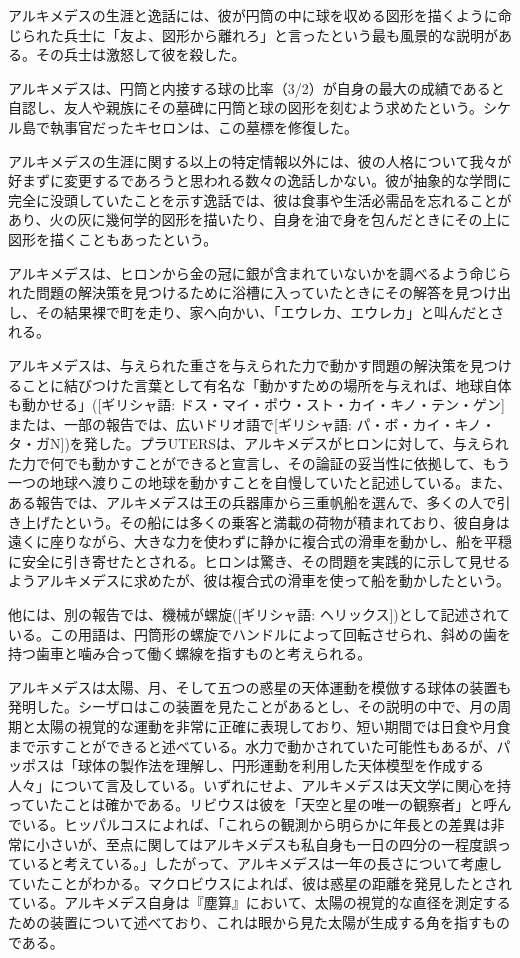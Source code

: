 \documentclass[a4paper,11pt,openany]{ltjsbook}
\begin{document}
アルキメデスの生涯と逸話には、彼が円筒の中に球を収める図形を描くように命じられた兵士に「友よ、図形から離れろ」と言ったという最も風景的な説明がある。その兵士は激怒して彼を殺した。

アルキメデスは、円筒と内接する球の比率（3/2）が自身の最大の成績であると自認し、友人や親族にその墓碑に円筒と球の図形を刻むよう求めたという。シケル島で執事官だったキセロンは、この墓標を修復した。

アルキメデスの生涯に関する以上の特定情報以外には、彼の人格について我々が好まずに変更するであろうと思われる数々の逸話しかない。彼が抽象的な学問に完全に没頭していたことを示す逸話では、彼は食事や生活必需品を忘れることがあり、火の灰に幾何学的図形を描いたり、自身を油で身を包んだときにその上に図形を描くこともあったという。

アルキメデスは、ヒロンから金の冠に銀が含まれていないかを調べるよう命じられた問題の解決策を見つけるために浴槽に入っていたときにその解答を見つけ出し、その結果裸で町を走り、家へ向かい、「エウレカ、エウレカ」と叫んだとされる。

アルキメデスは、与えられた重さを与えられた力で動かす問題の解決策を見つけることに結びつけた言葉として有名な「動かすための場所を与えれば、地球自体も動かせる」([ギリシャ語: ドス・マイ・ポウ・スト・カイ・キノ・テン・ゲン]または、一部の報告では、広いドリオ語で[ギリシャ語: パ・ボ・カイ・キノ・タ・ガΝ])を発した。プラUTERSは、アルキメデスがヒロンに対して、与えられた力で何でも動かすことができると宣言し、その論証の妥当性に依拠して、もう一つの地球へ渡りこの地球を動かすことを自慢していたと記述している。また、ある報告では、アルキメデスは王の兵器庫から三重帆船を選んで、多くの人で引き上げたという。その船には多くの乗客と満載の荷物が積まれており、彼自身は遠くに座りながら、大きな力を使わずに静かに複合式の滑車を動かし、船を平穏に安全に引き寄せたとされる。ヒロンは驚き、その問題を実践的に示して見せるようアルキメデスに求めたが、彼は複合式の滑車を使って船を動かしたという。

他には、別の報告では、機械が螺旋([ギリシャ語: ヘリックス])として記述されている。この用語は、円筒形の螺旋でハンドルによって回転させられ、斜めの歯を持つ歯車と噛み合って働く螺線を指すものと考えられる。

アルキメデスは太陽、月、そして五つの惑星の天体運動を模倣する球体の装置も発明した。シーザロはこの装置を見たことがあるとし、その説明の中で、月の周期と太陽の視覚的な運動を非常に正確に表現しており、短い期間では日食や月食まで示すことができると述べている。水力で動かされていた可能性もあるが、パッポスは「球体の製作法を理解し、円形運動を利用した天体模型を作成する人々」について言及している。いずれにせよ、アルキメデスは天文学に関心を持っていたことは確かである。リビウスは彼を「天空と星の唯一の観察者」と呼んでいる。ヒッパルコスによれば、「これらの観測から明らかに年長との差異は非常に小さいが、至点に関してはアルキメデスも私自身も一日の四分の一程度誤っていると考えている。」したがって、アルキメデスは一年の長さについて考慮していたことがわかる。マクロビウスによれば、彼は惑星の距離を発見したとされている。アルキメデス自身は『塵算』において、太陽の視覚的な直径を測定するための装置について述べており、これは眼から見た太陽が生成する角を指すものである。
\end{document}

